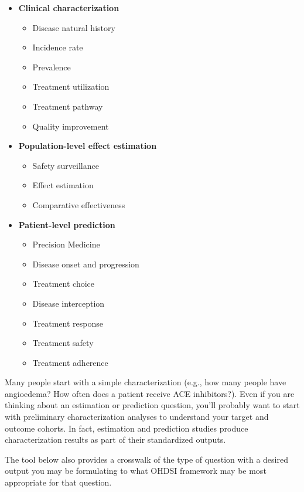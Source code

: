 \documentclass[11pt]{book}
\providecommand{\tightlist}{%
  \setlength{\itemsep}{0pt}\setlength{\parskip}{0pt}}
\theoremstyle{definition}
\theoremstyle{definition}
\theoremstyle{definition}
\theoremstyle{remark}
\begin{document}
\begin{itemize}
\tightlist
\item
  \textbf{Clinical characterization}

  \begin{itemize}
  \tightlist
  \item
    Disease natural history
  \item
    Incidence rate
  \item
    Prevalence
  \item
    Treatment utilization
  \item
    Treatment pathway
  \item
    Quality improvement
  \end{itemize}
\item
  \textbf{Population-level effect estimation}

  \begin{itemize}
  \tightlist
  \item
    Safety surveillance
  \item
    Effect estimation
  \item
    Comparative effectiveness
  \end{itemize}
\item
  \textbf{Patient-level prediction}

  \begin{itemize}
  \tightlist
  \item
    Precision Medicine
  \item
    Disease onset and progression
  \item
    Treatment choice
  \item
    Disease interception
  \item
    Treatment response
  \item
    Treatment safety
  \item
    Treatment adherence
  \end{itemize}
\end{itemize}

Many people start with a simple characterization (e.g., how many people have angioedema? How often does a patient receive ACE inhibitors?). Even if you are thinking about an estimation or prediction question, you'll probably want to start with preliminary characterization analyses to understand your target and outcome cohorts. In fact, estimation and prediction studies produce characterization results as part of their standardized outputs.

The tool below also provides a crosswalk of the type of question with a desired output you may be formulating to what OHDSI framework may be most appropriate for that question.
\end{document}
